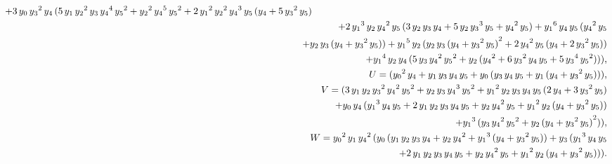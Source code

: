 \begin{pro}
\begin{eqnarray*}
 + 3\,{y_0}\,{{y_3}}^2\,{y_4}\,
  ( 5\,{y_1}\,{{y_2}}^2\,{y_3}\,{{y_4}}^4\,{{y_5}}^2 + 
       {{y_2}}^2\,{{y_4}}^5\,{{y_5}}^2 + 
       2\,{{y_1}}^2\,{{y_2}}^2\,{{y_4}}^3\,{y_5}\,
        ( {y_4} + 5\,{{y_3}}^2\,{y_5} )\\
&&\hspace{-20pt} 
+ 2\,{{y_1}}^3\,{y_2}\,{{y_4}}^2\,{y_5}\,
        ( 3\,{y_2}\,{y_3}\,{y_4}
 +  5\,{y_2}\,{{y_3}}^3\,{y_5} + {{y_4}}^2\,{y_5} )  + 
       {{y_1}}^6\,{y_4}\,{y_5}\,
        ( {{y_4}}^2\,{y_5} \\
&&\hspace{-20pt}+ 
     {y_2}\,{y_3}\,( {y_4} + {{y_3}}^2\,{y_5} )  ) 
       + {{y_1}}^5\,{y_2}\,( {y_2}\,{y_3}\,
           {( {y_4} + {{y_3}}^2\,{y_5} ) }^2 
+ 2\,{{y_4}}^2\,{y_5}\,( {y_4} 
+ 2\,{{y_3}}^2\,{y_5} )  )\\
&&\hspace{-20pt}
  + {{y_1}}^4\,{y_2}\,{y_4}\,
        ( 5\,{y_3}\,{{y_4}}^2\,{{y_5}}^2+ 
    {y_2}\,( {{y_4}}^2 + 6\,{{y_3}}^2\,{y_4}\,{y_5} + 
             5\,{{y_3}}^4\,{{y_5}}^2 )  )  ),\\
&&\hspace{-30pt}
U=( {{y_0}}^2\,{y_4} + {y_1}\,{y_3}\,{y_4}\,{y_5} + 
      {y_0}\,( {y_3}\,{y_4}\,{y_5} + 
 {y_1}\,( {y_4} + {{y_3}}^2\,{y_5} 
 )  )  ),\\
&&\hspace{-30pt}
V= ( 3\,{y_1}\,{y_2}\,{{y_3}}^2\,{{y_4}}^2\,{{y_5}}^2 + 
      {y_2}\,{y_3}\,{{y_4}}^3\,{{y_5}}^2 + 
      {{y_1}}^2\,{y_2}\,{y_3}\,{y_4}\,{y_5}\,
       ( 2\,{y_4} + 3\,{{y_3}}^2\,{y_5} )\\
&&\hspace{-20pt}  + 
      {y_0}\,{y_4}\,( {{y_1}}^3\,{y_4}\,{y_5} + 
     2\,{y_1}\,{y_2}\,{y_3}\,{y_4}\,{y_5} + 
     {y_2}\,{{y_4}}^2\,{y_5} + 
     {{y_1}}^2\,{y_2}\,( {y_4} + {{y_3}}^2\,{y_5} ) 
      ) \\
&&\hspace{-20pt}
 + {{y_1}}^3\,( {y_3}\,{{y_4}}^2\,{{y_5}}^2 + 
 {y_2}\,{( {y_4} + {{y_3}}^2\,{y_5} ) }^2 )),\\
&&\hspace{-30pt}
W={{y_0}}^2\,{y_1}\,{{y_4}}^2\,
    ( {y_0}\,( {y_1}\,{y_2}\,{y_3}\,{y_4} + 
   {y_2}\,{{y_4}}^2 + {{y_1}}^3\,
   ( {y_4} + {{y_3}}^2\,{y_5} ))  + 
   {y_3}\,( {{y_1}}^3\,{y_4}\,{y_5}\\
&&\hspace{-20pt} 
+ 2\,{y_1}\,{y_2}\,{y_3}\,{y_4}\,{y_5} + 
   {y_2}\,{{y_4}}^2\,{y_5} + 
   {{y_1}}^2\,{y_2}\,( {y_4} + {{y_3}}^2\,{y_5}))).
\end{eqnarray*}
\end{pro}
